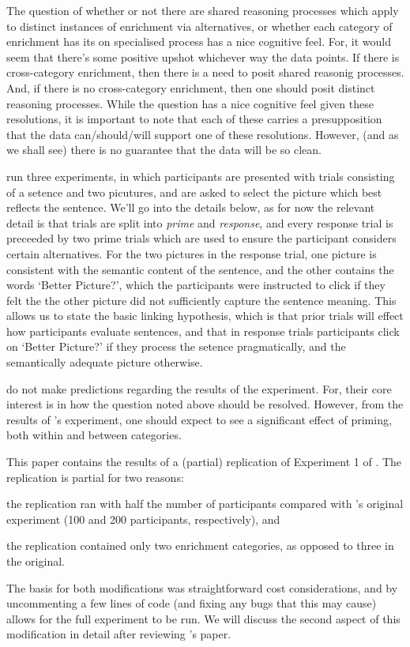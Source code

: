 \documentclass[10pt]{article}
\begin{document}
\begin{multicols}{2}
The question of whether or not there are shared reasoning processes which apply to distinct instances of enrichment via alternatives, or whether each category of enrichment has its on specialised process has a nice cognitive feel.
For, it would seem that there's some positive upshot whichever way the data points.
If there is cross-category enrichment, then there is a need to posit shared reasonig processes.
And, if there is no cross-category enrichment, then one should posit distinct reasoning processes.
While the question has a nice cognitive feel given these resolutions, it is important to note that each of these carries a presupposition that the data can/should/will support one of these resolutions.
However, (and as we shall see) there is no guarantee that the data will be so clean.

\citeauthor{Bott:2016aa} run three experiments, in which participants are presented with trials consisting of a setence and two picutures, and are asked to select the picture which best reflects the sentence.
We'll go into the details below, as for now the relevant detail is that trials are split into \emph{prime} and \emph{response}, and every response trial is preceeded by two prime trials which are used to ensure the participant considers certain alternatives.
For the two pictures in the response trial, one picture is consistent with the semantic content of the sentence, and the other contains the words `Better Picture?', which the participants were instructed to click if they felt the the other picture did not sufficiently capture the sentence meaning.
This allows us to state the basic linking hypothesis, which is that prior trials will effect how participants evaluate sentences, and that in response trials participants click on `Better Picture?' if they process the setence pragmatically, and the semantically adequate picture otherwise.

\citeauthor{Bott:2016aa} do not make predictions regarding the results of the experiment.
For, their core interest is in how the question noted above should be resolved.
However, from the results of \citeauthor{Bott:2016aa}'s experiment, one should expect to see a significant effect of priming, both within and between categories.

This paper contains the results of a (partial) replication of Experiment 1 of \textcite{Bott:2016aa}.
The replication is partial for two reasons:
\begin{enumerate*}[label=\arabic*)]
\item the replication ran with half the number of participants compared with \citeauthor{Bott:2016aa}'s original experiment (100 and 200 participants, respectively), and
\item the replication contained only two enrichment categories, as opposed to three in the original.
\end{enumerate*}
The basis for both modifications was straightforward cost considerations, and by uncommenting a few lines of code (and fixing any bugs that this may cause) allows for the full experiment to be run.
We will discuss the second aspect of this modification in detail after reviewing \citeauthor{Bott:2016aa}'s paper.


\end{multicols}
\end{document}
